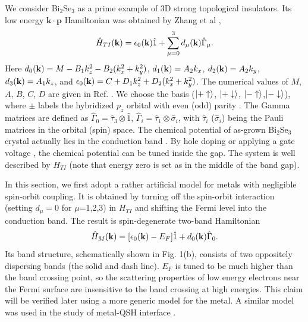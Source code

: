 We consider Bi$_2$Se$_3$ as a prime example of 3D strong topological insulators. Its low energy $\mathbf{k\cdot p}$ Hamiltonian was obtained by Zhang et al \cite{zhang2009},
\[
\hat{H}_{TI}(\mathbf{k})=\epsilon_0(\mathbf{k})\hat{1}+\sum_{\mu=0}^{3}d_\mu(\mathbf{k})\hat{\Gamma}_\mu.
\]
Here $d_0(\mathbf{k})=M-B_1k^2_z-B_2(k_x^2+k_y^2)$, $d_1(\mathbf{k})=A_2 k_x$, $d_2(\mathbf{k})=A_2 k_y$, $d_3(\mathbf{k})=A_1 k_z$, and $\epsilon_0(\mathbf{k})=C+D_1k_z^2+D_2(k_x^2+k_y^2)$. The numerical values of $M$, $A$, $B$, $C$, $D$ are given in Ref. 
\cite{zhang2009}.
We choose the basis ($\vert +\uparrow \rangle$, $\vert +\downarrow \rangle$, $\vert -\uparrow \rangle$,$\vert -\downarrow \rangle$), where $\pm$ labels the hybridized $p_z$ orbital with even (odd) parity \cite{zhang2009}. The Gamma matrices are defined as
$\hat{\Gamma}_0=\hat{\tau}_3\otimes \hat{1}$, $\hat{\Gamma}_i=\hat{\tau}_1\otimes \hat{\sigma}_i$, with
$\hat{\tau}_i$ ($\hat{\sigma}_i$) being the Pauli matrices in the orbital (spin) space.
The chemical potential of as-grown Bi$_2$Se$_3$ crystal actually lies in the conduction 
band \cite{Hsieh2009}. By hole doping \cite{Hsieh2009} 
or applying a gate voltage \cite{gate}, the chemical potential can be tuned inside 
the gap. The system is well described by $H_{TI}$ (note that energy zero is set as 
in the middle of the band gap).

In this section, we first adopt a rather artificial model for metals with negligible 
spin-orbit coupling. It is
obtained by turning off the spin-orbit interaction (setting $d_\mu=0$ for $\mu$=1,2,3) 
in $H_{TI}$ and shifting the Fermi level into 
the conduction band. The result is spin-degenerate two-band Hamiltonian
\[
\hat{H}_M(\mathbf{k})=[\epsilon_0(\mathbf{k})-E_F]\hat{1}+d_0(\mathbf{k})\hat{\Gamma}_0.
\]
Its band structure, schematically shown in Fig. 1(b), consists of two oppositely dispersing bands 
(the solid and dash line). $E_F$ is tuned to be much higher than the band crossing point, so
the scattering properties of low energy electrons near the Fermi surface are 
insensitive to the band crossing at high energies. This claim will be verified later using a
more generic model for the metal. A similar model was used in the study of metal-QSH interface \cite{yokoyama09}.


